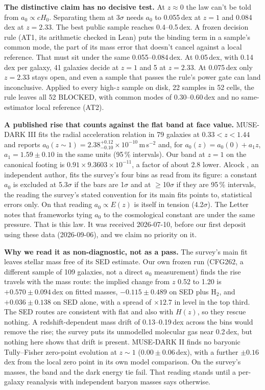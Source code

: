 \documentclass[10pt]{article}
\begin{document}
\textbf{The distinctive claim has no decisive test.} At $z\approx0$ the law can't be told from $a_0\propto cH_0$. Separating them at 3$\sigma$ needs $a_0$ to 0.055\,dex at $z=1$ and 0.084\,dex at $z=2.33$. The best public sample reaches 0.4--0.5\,dex. A frozen decision rule (AT1, its arithmetic checked in Lean) puts the binding term in a sample's common mode, the part of its mass error that doesn't cancel against a local reference. That must sit under the same 0.055--0.084\,dex. At 0.05\,dex, with 0.14\,dex per galaxy, 41 galaxies decide at $z=1$ and 5 at $z=2.33$. At 0.075\,dex only $z=2.33$ stays open, and even a sample that passes the rule's power gate can land inconclusive. Applied to every high-$z$ sample on disk, 22 samples in 52 cells, the rule leaves all 52 BLOCKED, with common modes of 0.30--0.60\,dex and no same-estimator local reference (AT2).

\textbf{A published rise that counts against the flat band at face value.} MUSE-DARK III \cite{C26} fits the radial acceleration relation in 79 galaxies at $0.33<z<1.44$ and reports $a_0(z\sim1)=2.38^{+0.12}_{-0.10}\times10^{-10}$\,m\,s$^{-2}$ and, for $a_0(z)=a_0(0)+a_1z$, $a_1=1.59\pm0.10$ in the same units (95\,\% intervals). Our band at $z=1$ on the canonical footing is $0.91\times9.3603\times10^{-11}$, a factor of about 2.8 lower. Alcock \cite{Al26}, an independent author, fits the survey's four bins as read from its figure: a constant $a_0$ is excluded at 5.3$\sigma$ if the bars are 1$\sigma$ and at $\ge$10$\sigma$ if they are 95\,\% intervals, the reading the survey's stated convention for its main fits points to, statistical errors only. On that reading $a_0\propto E(z)$ is itself in tension (4.2$\sigma$). The Letter notes that frameworks tying $a_0$ to the cosmological constant are under the same pressure. That is this law. It was received 2026-07-10, before our first deposit using these data (2026-09-06), and we claim no priority on it.

\textbf{Why we read it as non-diagnostic, not as a pass.} The survey's main fit leaves stellar mass free of its SED estimate. Our own frozen run (CFG262, a different sample of 109 galaxies, not a direct $a_0$ measurement) finds the rise travels with the mass route: the implied change from $z$ 0.52 to 1.20 is $+0.570\pm0.094$\,dex on fitted masses, $-0.115\pm0.489$ on SED plus H$_2$, and $+0.036\pm0.138$ on SED alone, with a spread of $\times12.7$ in level in the top third. The SED routes are consistent with flat and also with $H(z)$, so they rescue nothing. A redshift-dependent mass drift of 0.13--0.19\,dex across the bins would remove the rise; the survey puts its unmodelled molecular gas near 0.2\,dex, but nothing here shows that drift is present. MUSE-DARK II \cite{J26} finds no baryonic Tully--Fisher zero-point evolution at $z\sim1$ ($0.00\pm0.06$\,dex), with a further $\pm0.16$\,dex from the local zero point in its own model comparison. On the survey's masses, the band and the dark energy tie fail. That reading stands until a per-galaxy reanalysis with independent baryon masses says otherwise.
\end{document}
